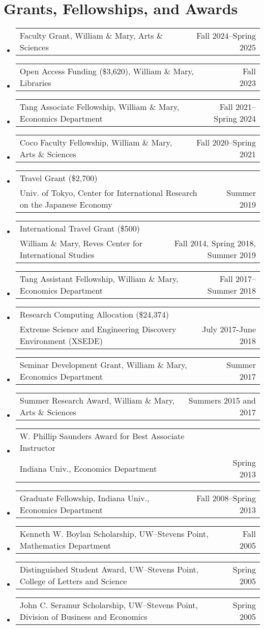 \documentclass[10pt,letterpaper,en-US]{article}
\makeatletter
\newcommand{\itemrow}[2]
{\begin{tabular*}{\linewidth}{l@{\extracolsep{\fill}}r}
	#1 & #2 \\
\end{tabular*}}
\makeatother
\begin{document}
\section*{Grants, Fellowships, and Awards}
\begin{itemize}
\item \itemrow{Faculty Grant, William \& Mary, Arts \& Sciences}{Fall 2024--Spring 2025}
\item \itemrow{Open Access Funding (\$3,620), William \& Mary, Libraries}{Fall 2023}
\item \itemrow{Tang Associate Fellowship, William \& Mary, Economics Department}{Fall 2021--Spring 2024}
\item \itemrow{Coco Faculty Fellowship, William \& Mary, Arts \& Sciences}{Fall 2020--Spring 2021}
\item \itemrow{Travel Grant (\$2,700) \\ Univ. of Tokyo, Center for International Research on the Japanese Economy}{Summer 2019}
\item \itemrow{International Travel Grant (\$500) \\ William \& Mary, Reves Center for International Studies}{Fall 2014, Spring 2018, Summer 2019}
\item \itemrow{Tang Assistant Fellowship, William \& Mary, Economics Department}{Fall 2017--Summer 2018}
\item \itemrow{Research Computing Allocation (\$24,374)\\
Extreme Science and Engineering Discovery Environment (XSEDE)}{July 2017-June 2018}
\item \itemrow{Seminar Development Grant, William \& Mary, Economics Department}{Summer 2017}
\item \itemrow{Summer Research Award, William \& Mary, Arts \& Sciences}{Summers 2015 and 2017}
\item \itemrow{W. Phillip Saunders Award for Best Associate Instructor \\
Indiana Univ., Economics Department}{Spring 2013}
\item \itemrow{Graduate Fellowship, Indiana Univ., Economics Department}{Fall 2008--Spring 2013}
\item \itemrow{Kenneth W. Boylan Scholarship, UW--Stevens Point, Mathematics Department}{Fall 2005}
\item \itemrow{Distinguished Student Award, UW--Stevens Point, College of Letters and Science}{Spring 2005}
\item \itemrow{John C. Seramur Scholarship, UW--Stevens Point, Division of Business and Economics}{Spring 2005}
\end{itemize}
\newpage
\end{document}
